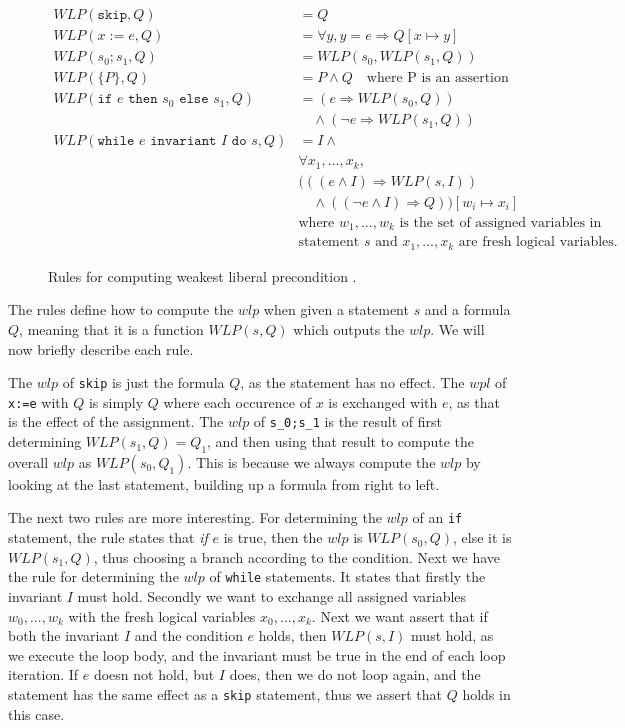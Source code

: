 \begin{figure}[h!]
\begin{align*}
WLP(\texttt{skip}, Q) &= Q \\
WLP(x:=e,Q) &= \forall y, y = e \Rightarrow Q[x \mapsto y] \\
WLP(s_0;s_1, Q) &= WLP(s_0, WLP(s_1, Q)) \\
WLP(\{P\}, Q) &= P \land Q \quad \text{where P is an assertion} \\
WLP(\texttt{if } e \texttt{ then } s_0 \texttt{ else } s_1, Q) &= (e \Rightarrow WLP(s_0, Q)) \\
    &\quad \land (\neg e \Rightarrow WLP(s_1, Q)) \\
WLP(\texttt{while } e \texttt{ invariant } I \texttt{ do } s, Q) &=
    I \land \\
&\forall x_1, ..., x_k, \\
&(((e \land I) \Rightarrow WLP(s, I)) \\
&\quad \land (( \neg e \land I) \Rightarrow Q))
    [w_i \mapsto x_i] \\
&\text{where } w_1, ..., w_k \text{ is the set of assigned variables in} \\
&\text{statement } s \text{ and } x_1, ..., x_k \text{ are fresh logical variables.}
\end{align*}
\caption{Rules for computing weakest liberal precondition \cite{wlp}.}
\label{fig:wlp}
\end{figure}

The rules define how to compute the $wlp$ when given a statement $s$ and a formula $Q$, meaning that it is a function $WLP(s,Q)$ which outputs the $wlp$.
We will now briefly describe each rule.

The $wlp$ of \texttt{skip} is just the formula $Q$, as the statement has no effect.
The $wpl$ of \texttt{x:=e} with $Q$ is simply $Q$ where each occurence of $x$ is exchanged with $e$, as that is the effect of the assignment.
The $wlp$ of \texttt{s_0;s_1} is the result of first determining $WLP(s_{1},Q) = Q_{1}$, and then using that result to compute the overall $wlp$ as $WLP(s_{0}, Q_{1})$. This is because we always compute the $wlp$ by looking at the last statement, building up a formula from right to left.

The next two rules are more interesting.
For determining the $wlp$ of an \texttt{if} statement, the rule states that \textit{if} $e$ is true, then the $wlp$ is $WLP(s_{0}, Q)$, else it is $WLP(s_{1},Q)$, thus choosing a branch according to the condition.
Next we have the rule for determining the $wlp$ of \texttt{while} statements.
It states that firstly the invariant $I$ must hold. Secondly we want to exchange all assigned variables $w_{0},...,w_{k}$ with the fresh logical variables $x_{0},...,x_{k}$. Next we want assert that if both the invariant $I$ and the condition $e$ holds, then $WLP(s, I)$ must hold, as we execute the loop body, and the invariant must be true in the end of each loop iteration. If $e$ doesn not hold, but $I$ does, then we do not loop again, and the statement has the same effect as a \texttt{skip} statement, thus we assert that $Q$ holds in this case.


